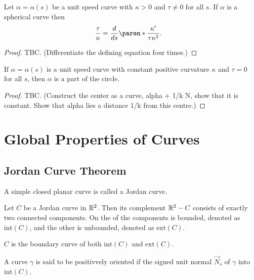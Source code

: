 \documentclass[11pt]{penrose}
\newcommand{\vN}{\vec{N}}
\renewcommand{\interior}[1]{\mathrm{int}(#1)}
\newcommand{\exterior}[1]{\mathrm{ext}(#1)}
\begin{document}
\begin{nthm}
    Let $\alpha = \alpha(s)$ be a unit speed curve with $\kappa > 0$ and $\tau \neq 0$ for all $s$. If $\alpha$ is a spherical curve then
    \begin{equation}
        \frac{\tau}{\kappa} = \frac{d}{ds}\paren*{\frac{\kappa'}{\tau \kappa^2}}.
    \end{equation}
\end{nthm}
\begin{proof}
    TBC. (Differentiate the defining equation four times.)
\end{proof}

\begin{nthm}
    If $\alpha = \alpha(s)$ is a unit speed curve with constant positive curvature $\kappa$ and $\tau = 0$ for all $s$, then $\alpha$ is a part of the circle.
\end{nthm}
\begin{proof}
    TBC. (Construct the center as a curve, alpha + 1/k N, show that it is constant. Show that alpha lies a distance 1/k from this centre.)
\end{proof}

\section{Global Properties of Curves}
\subsection{Jordan Curve Theorem}

\begin{ndfn}
    A simple closed planar curve is called a Jordan curve.
\end{ndfn}

\begin{nthm}
    Let $C$ be a Jordan curve in $\mathbb{R}^2$. Then its complement $\mathbb{R}^2 - C$ consists of exactly two connected components. On the of the components is bounded, denoted as $\interior{C}$, and the other is unbounded, denoted as $\exterior{C}$.

    $C$ is the boundary curve of both $\interior{C}$ and $\exterior{C}$.
\end{nthm}

\begin{ndfn}
    A curve $\gamma$ is said to be positivvely oriented if the signed unit normal $\vN_s$ of $\gamma$ into $\interior{C}$.
\end{ndfn}
\end{document}
